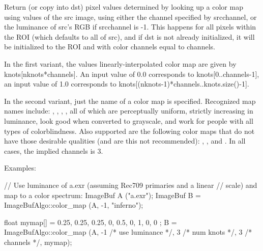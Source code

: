 Return (or copy into {\cf dst}) pixel values determined by looking up a
color map using values of the {\cf src} image, using either the channel
specified by {\cf srcchannel}, or the luminance of {\cf src}'s RGB if {\cf
srcchannel} is -1. This happens for all pixels within the ROI (which
defaults to all of {\cf src}), and if {\cf dst} is not already initialized,
it will be initialized to the ROI and with color channels equal to {\cf channels}.

In the first variant, the values linearly-interpolated color map are
given by {\cf knots[nknots*channels]}.
An input value of 0.0 corresponds to {\cf knots[0..channels-1]}, an input
value of 1.0 corresponds to {\cf knots[(nknots-1)*channels..knots.size()-1]}.

In the second variant, just the name of a color map is specified. Recognized
map names include: , , , ,
all of which are perceptually uniform, strictly increasing in luminance,
look good when converted to grayscale, and work for people with all types of
colorblindness. Also supported are the following color maps that do not have
those desirable qualities (and are this not recommended): ,
, and . In all cases, the implied {\cf channels} is
3.

\smallskip
\noindent Examples:
\begin{code}
    // Use luminance of a.exr (assuming Rec709 primaries and a linear
    // scale) and map to a color spectrum:
    ImageBuf A ("a.exr");
    ImageBuf B = ImageBufAlgo::color_map (A, -1, "inferno");

    float mymap[] = { 0.25, 0.25, 0.25,  0, 0.5, 0,  1, 0, 0 };
    B = ImageBufAlgo::color_map (A, -1 /* use luminance */,
                                 3 /* num knots */, 3 /* channels */,
                                 mymap);
\end{code}

